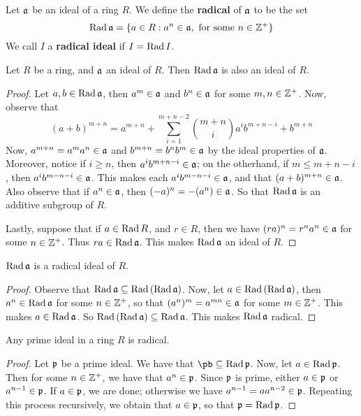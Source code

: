 \begin{definition}
    Let $\mathfrak{a}$ be an ideal of a ring  $R$. We define the  \textbf{radical} of
    $\mathfrak{a}$
    to be the set
    \begin{equation*}
        \operatorname{Rad}{\mathfrak{a}}=\{a \in R : a^n \in \mathfrak{a}, \text{ for some } n \in \mathbb{Z}^+\}
    \end{equation*}
    We call $I$ a \textbf{radical ideal} if $I=\operatorname{Rad}{I}$.
\end{definition}

\begin{lemma}\label{1.3.3}
    Let $R$ be a ring, and $\mathfrak{a}$ an ideal of $R$. Then $\operatorname{Rad}{\mathfrak{a}}$ is also an
    ideal of $R$.
\end{lemma}
\begin{proof}
    Let $a,b \in \operatorname{Rad}{\mathfrak{a}}$, then $a^m \in \mathfrak{a}$ and $b^n \in \mathfrak{a}$ for some $m,n
    \in \mathbb{Z}^+$. Now, observe that
    \begin{equation*}
        (a+b)^{m+n}=a^{m+n}+\sum_{i=1}^{m+n-2}{{m+n \choose
        i}a^{i}b^{m+n-i}}+b^{m+n}
    \end{equation*}
    Now, $a^{m+n}=a^ma^n \in \mathfrak{a}$ and $b^{m+n}=b^nb^m \in \mathfrak{a}$ by the ideal
    properties of $\mathfrak{a}$. Moreover, notice if $i \geq n$, then $a^ib^{m+n-i} \in
    \mathfrak{a}$; on the otherhand, if $m \leq m+n-i$, then $a^ib^{m-n-i} \in \mathfrak{a}$. This
    makes each $a^ib^{m-n-i} \in \mathfrak{a}$, and that $(a+b)^{m+n} \in \mathfrak{a}$. Also
    observe that if $a^n \in \mathfrak{a}$, then $(-a)^n=-(a^n) \in \mathfrak{a}$. So that
    $\operatorname{Rad}{\mathfrak{a}}$ is an additive subgroup of $R$.

    Lastly, suppose that if $a \in \operatorname{Rad}{R}$, and $r \in R$, then we have
    $(ra)^n=r^na^n \in \mathfrak{a}$ for some $n \in \mathbb{Z}^+$. Thus $ra \in \operatorname{Rad}{\mathfrak{a}}$. This
    makes $\operatorname{Rad}{\mathfrak{a}}$ an ideal of $R$.
\end{proof}
\begin{corollary}
    $\operatorname{Rad}{\mathfrak{a}}$ is a radical ideal of $R$.
\end{corollary}
\begin{proof}
    Observe that $\operatorname{Rad}{\mathfrak{a}} \subseteq \operatorname{Rad}{(\operatorname{Rad}{\mathfrak{a}})}$. Now, let $a \in
    \operatorname{Rad}{(\operatorname{Rad}{\mathfrak{a}})}$, then $a^n \in \operatorname{Rad}{\mathfrak{a}}$ for some $n \in \mathbb{Z}^+$, so that
    $(a^n)^m=a^{mn} \in \mathfrak{a}$ for some $m \in \mathbb{Z}^+$. This makes $a \in
    \operatorname{Rad}{\mathfrak{a}}$. So $\operatorname{Rad}{(\operatorname{Rad}{\mathfrak{a}})} \subseteq \operatorname{Rad}{\mathfrak{a}}$. This makes
    $\operatorname{Rad}{\mathfrak{a}}$ radical.
\end{proof}

\begin{lemma}\label{1.3.4}
    Any prime ideal in a ring $R$ is radical.
\end{lemma}
\begin{proof}
    Let $\mathfrak{p}$ be a prime ideal. We have that $\pb \subseteq \Rad{\pf}$. Now, let
    $a \in \operatorname{Rad}{\mathfrak{p}}$. Then for some $n \in \mathbb{Z}^+$, we have that $a^n \in \mathfrak{p}$.
    Since $\mathfrak{p}$ is prime, either $a \in \mathfrak{p}$ or $a^{n-1} \in \mathfrak{p}$. If $a \in
    \mathfrak{p}$, we are done; otherwise we have $a^{n-1}=aa^{n-2} \in \mathfrak{p}$. Repeating
    this process recursively, we obtain that $a \in \mathfrak{p}$, so that
    $\mathfrak{p}=\operatorname{Rad}{\mathfrak{p}}$.
\end{proof}

